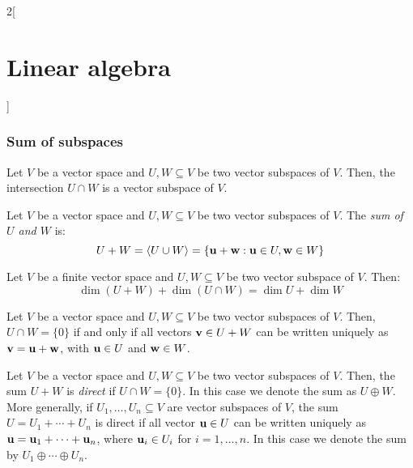 \documentclass[../../../main.tex]{subfiles}
\begin{document}
\begin{multicols}{2}[\section{Linear algebra}]
  \subsubsection{Sum of subspaces}
  \begin{lemma}
    Let $V$ be a vector space and $U,W\subseteq V$ be two vector subspaces of $V$. Then, the intersection $U\cap W$ is a vector subspace of $V$.
  \end{lemma}
  \begin{definition}
    Let $V$ be a vector space and $U,W\subseteq V$ be two vector subspaces of $V$. The \textit{sum of $U$ and $W$} is: $$U+W=\langle U\cup W\rangle=\{\boldsymbol{\mathrm{u}}+\boldsymbol{\mathrm{w}}: \boldsymbol{\mathrm{u}}\in U,\boldsymbol{\mathrm{w}}\in W\}$$
  \end{definition}
  \begin{prop}
    Let $V$ be a finite vector space and $U,W\subseteq V$ be two vector subspace of $V$. Then: $$\dim (U+W)+\dim(U\cap W)=\dim U+\dim W$$
  \end{prop}
  \begin{lemma}
    Let $V$ be a vector space and $U,W\subseteq V$ be two vector subspaces of $V$. Then, $U\cap W=\{0\}$ if and only if all vectors $\boldsymbol{\mathrm{v}}\in U+W$ can be written uniquely as $\boldsymbol{\mathrm{v}}=\boldsymbol{\mathrm{u}}+\boldsymbol{\mathrm{w}}$, with $\boldsymbol{\mathrm{u}}\in U$ and $\boldsymbol{\mathrm{w}}\in W$.
  \end{lemma}
  \begin{definition}
    Let $V$ be a vector space and $U,W\subseteq V$ be two vector subspaces of $V$. Then, the sum $U+W$ is \textit{direct} if $U\cap W=\{0\}$. In this case we denote the sum as $U\oplus W$. More generally, if $U_1,\ldots,U_n\subseteq V$ are vector subspaces of $V$, the sum $U=U_1+\cdots+U_n$ is direct if all vector $\boldsymbol{\mathrm{u}}\in U$ can be written uniquely as $\boldsymbol{\mathrm{u}}=\boldsymbol{\mathrm{u}}_1+\cdots+\boldsymbol{\mathrm{u}}_n$, where $\boldsymbol{\mathrm{u}}_i\in U_i$ for $i=1,\ldots,n$. In this case we denote the sum by $U_1\oplus\cdots\oplus U_n$.
  \end{definition}

\end{multicols}
\end{document}
